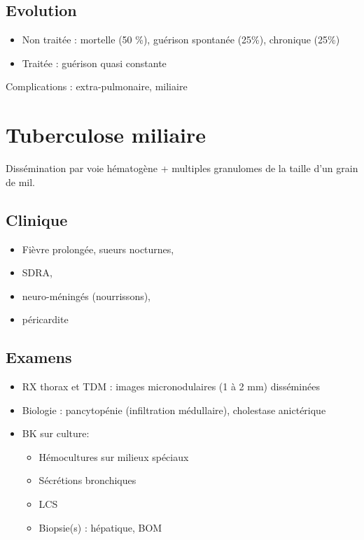 \documentclass[a4paper,11pt,twoside,twocolumn]{article}
\begin{document}
\subsection*{Evolution}
\label{sec:orgb057e45}

\begin{itemize}
\item Non traitée : mortelle (50 \%), guérison spontanée (25\%), chronique (25\%)
\item Traitée : guérison quasi constante
\end{itemize}
Complications : extra-pulmonaire, miliaire

\section*{Tuberculose miliaire}
\label{sec:orgbe6feaf}

Dissémination par voie hématogène + multiples granulomes de la taille d'un grain de mil.
\subsection*{Clinique}
\label{sec:org2ed3d81}
\begin{itemize}
\item Fièvre prolongée, sueurs nocturnes,
\item SDRA,
\item neuro-méningés (nourrissons),
\item péricardite
\end{itemize}
\subsection*{Examens}
\label{sec:org93ccf1f}
\begin{itemize}
\item RX thorax et TDM : images micronodulaires (1 à 2 mm) disséminées
\item Biologie : pancytopénie (infiltration médullaire), cholestase anictérique
\item BK sur culture:
\begin{itemize}
\item Hémocultures sur milieux spéciaux
\item Sécrétions bronchiques
\item LCS
\item Biopsie(s) : hépatique, BOM
\end{itemize}
\end{itemize}
\end{document}
